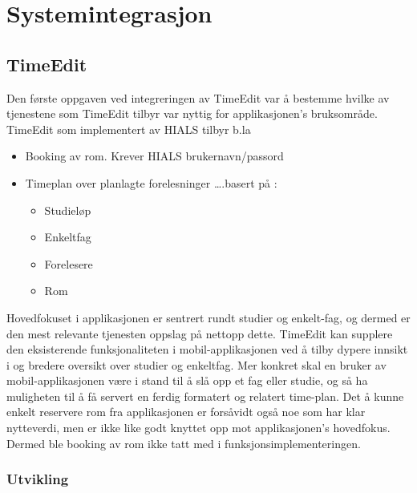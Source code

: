 \documentclass[../main.tex]{subfiles}
\begin{document}
\section{Systemintegrasjon}

\subsection{TimeEdit}

Den første oppgaven ved integreringen av TimeEdit var å bestemme hvilke av tjenestene som TimeEdit tilbyr var nyttig for applikasjonen’s bruksområde. TimeEdit som implementert av HIALS tilbyr b.la 

\begin{itemize}
\item Booking av rom.  \newline
Krever HIALS brukernavn/passord
\item Timeplan over planlagte forelesninger  \newline
 ….basert på :
\begin{itemize}
\item Studieløp
\item Enkeltfag
\item Forelesere
\item Rom
\end{itemize}
\end{itemize}

Hovedfokuset i applikasjonen er sentrert rundt studier og enkelt-fag, og dermed er den mest relevante tjenesten oppslag på nettopp dette. TimeEdit kan supplere den eksisterende funksjonaliteten i mobil-applikasjonen ved å tilby dypere innsikt i og bredere oversikt over studier og enkeltfag. Mer konkret skal en bruker av mobil-applikasjonen være i stand til å slå opp et fag eller studie, og så ha muligheten til å få servert en ferdig formatert og relatert time-plan.
Det å kunne enkelt reservere rom fra applikasjonen er forsåvidt også noe som har klar nytteverdi, men er ikke like godt knyttet opp mot applikasjonen’s hovedfokus. Dermed ble booking av rom ikke tatt med i funksjonsimplementeringen.

\subsubsection{Utvikling}
\end{document}
